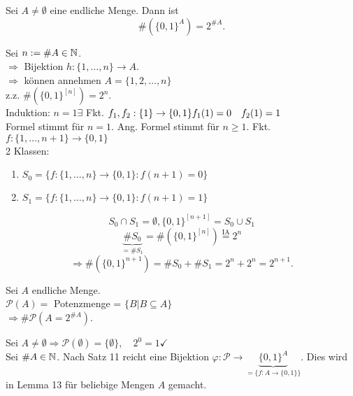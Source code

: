 \documentclass[../ana1.tex]{subfiles}
\begin{document}
\begin{satz}
	Sei \(A\neq\emptyset \) eine endliche Menge. Dann ist 
	\[ \#( {\{0,1\}}^A) = 2^{\#A}.\]
\end{satz}
\begin{bew}
	Sei \(n := \# A \in\mathbb{N} \).\\
	\(\Rightarrow \) Bijektion \(h:\{1,\ldots,n\} \rightarrow A\).\\
	\( \Rightarrow \) können annehmen \(A = \{1,2,\ldots,n\} \) \\
	z.z. \( \#( {\{0,1\}}^{[n]} ) = 2^n\).\\
	Induktion: \(n=1 \exists \) Fkt. \(f_1,f_2 : \{1\} \rightarrow \{0,1\} \\
	f_1(1) = 0 \quad f_2(1) = 1 \) \\
	Formel stimmt für \(n=1\).
	Ang. Formel stimmt für \(n\geq 1\). Fkt. \(f: \{1,\ldots, n+1\} \rightarrow \{0,1\} \) \\
	2 Klassen:
	\begin{enumerate}
		\item \(S_0 = \{f: \{1,\ldots,n\} \rightarrow \{0,1\}: f(n+1) = 0 \} \)
		\item \(S_1 = \{f: \{1,\ldots,n\} \rightarrow \{0,1\}: f(n+1) = 1 \} \)
	\end{enumerate}
	\[S_0 \cap S_1 = \emptyset, {\{0,1\}}^{[n+1]} = S_0 \cup S_1 \]
	\[\underbrace{\# S_0}_{=\#S_1} = \# ( {\{0,1\}}^{[n]} )  \overset{\text{IA}}{=} 2^n \]
	\[ \Rightarrow \# ( {\{0,1\}}^{n+1} ) = \#S_0+\#S_1 = 2^n + 2^n = 2^{n+1}. \]
\end{bew}

\begin{kor}
	Sei \(A\) endliche Menge. \\
	\(\mathcal{P}(A) = \) Potenzmenge = \( \{B | B \subseteq A\} \) \\
	\(\Rightarrow \#\mathcal{P}(A = 2^{\#A}) \).
\end{kor}
\begin{bew}
	Sei \(A\neq \emptyset \Rightarrow\mathcal{P}(\emptyset) = \{\emptyset \}, \quad 2^0 = 1 \checkmark{}\) \\
	Sei \( \#A \in\mathbb{N} \). Nach Satz 11 reicht eine Bijektion \( \varphi : \mathcal{P} \rightarrow \underbrace{{\{0,1\}}^A}_{= \{f: A \rightarrow \{0,1 \} \}} \). Dies wird in Lemma 13 für beliebige Mengen \(A\) gemacht.
\end{bew}
\end{document}
